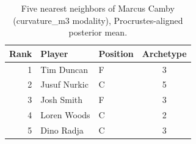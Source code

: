 \begin{table}[htbp]
  \centering\small
  \begin{tabular}{rllc}
    \toprule
    Rank & Player & Position & Archetype \\
    \midrule
    1 & Tim Duncan & F & 3 \\
    2 & Jusuf Nurkic & C & 5 \\
    3 & Josh Smith & F & 3 \\
    4 & Loren Woods & C & 2 \\
    5 & Dino Radja & C & 3 \\
    \bottomrule
  \end{tabular}
  \caption{Five nearest neighbors of Marcus Camby (curvature_m3 modality), Procrustes-aligned posterior mean.}
  \label{tab:Marcus_Camby_neighbors_curvature_m3}
\end{table}


